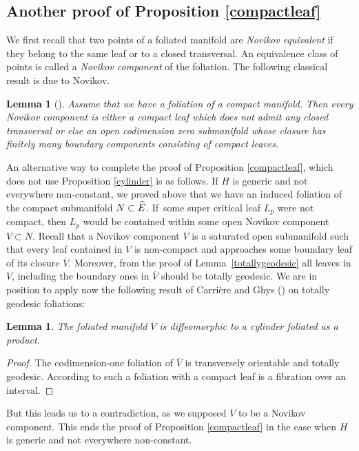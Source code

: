 \documentclass[JEP,XML,SOM,Unicode]{cedram}
\newtheorem{lemma}[theorem]{Lemma}
\theoremstyle{definition}
\theoremstyle{remark}
\numberwithin{equation}{section}
\begin{document}
\subsection{Another proof of Proposition \ref{compactleaf}}
We first recall that two points of a foliated manifold are \emph{Novikov equivalent} if
they belong to the same leaf or to a closed transversal.
An equivalence class of points is called a \emph{Novikov component} of the foliation.
The following classical result is due to Novikov.
\begin{lemma}[\cite{Nov}]\label{novikov}
Assume that we have a foliation of a compact manifold.
Then every Novikov component is either a compact leaf which does not admit
any closed transversal or else an open codimension zero
submanifold whose closure has finitely many boundary components
consisting of compact leaves.
\end{lemma}
An alternative way to complete the proof of Proposition \ref{compactleaf},
which does not use Proposition \ref{cylinder}
is as follows. If $H$ is generic and
not everywhere non-constant, we proved above that we have an induced
foliation of the compact submanifold $N\subset\nobreak \widehat{E}$.
If~some super critical leaf $L_p$ were not compact,
then $L_p$ would be contained within some open Novikov component
$V\subset N$. Recall that a Novikov component $V$ is a saturated open submanifold
such that every leaf contained in $V$ is non-compact and \hbox{approaches} some boundary leaf of
its closure $\overline{V}$. Moreover, from the proof of Lemma~\ref{totallygeodesic}
all leaves in $V$, including the boundary ones in $\overline{V}$ should be totally geodesic.
We are in position to apply now the following result of Carrière and Ghys (\cite{Car-Ghys}) on
totally geodesic foliations:

\begin{lemma}\label{cylinder2}
The foliated manifold $\overline{V}$ is diffeomorphic to a
cylinder foliated as a product.
\end{lemma}
\begin{proof}
The codimension-one foliation of $\overline{V}$ is transversely orientable and
totally geodesic. According to \cite[Prop.\,II.2]{Car-Ghys} such a foliation with a
compact leaf is a fibration over an interval.
\end{proof}

But this leads us to a contradiction, as we supposed $V$ to be a Novikov component.
This ends the proof of Proposition \ref{compactleaf} in the case when $H$ is generic and
not everywhere non-constant.
\end{document}
